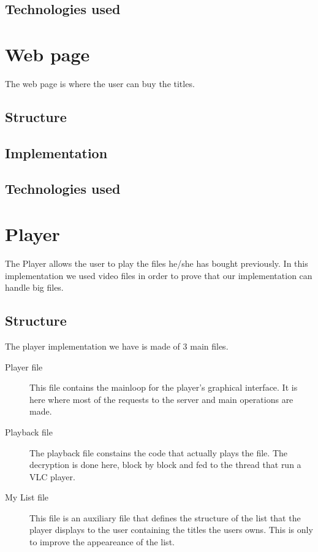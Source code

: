 \documentclass[11pt,a4paper]{report}
\begin{document}
\subsection{Technologies used}


\section{Web page}
The web page is where the user can buy the titles.
\subsection{Structure}
\subsection{Implementation}
\subsection{Technologies used}

\section{Player}
The Player allows the user to play the files he/she has bought previously. 
\newline  In this implementation we used video files in order to prove that our implementation can handle big files.

\subsection{Structure}
The player implementation we have is made of 3 main files. 

\begin{description}
  \item[Player file] This file contains the mainloop for the player's graphical interface. It is here where most of the requests to the server and main operations are made.
  \item[Playback file] The playback file constains the code that actually plays the file. The decryption is done here, block by block and fed to the thread that run a VLC player.
  \item[My List file] This file is an auxiliary file that defines the structure of the list that the player displays to the user containing the titles the users owns. This is only to improve the appeareance of the list.
\end{description}
\end{document}

